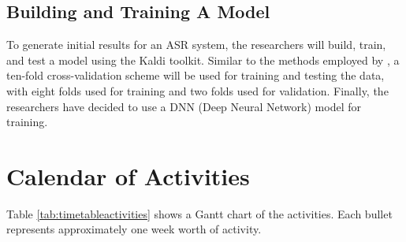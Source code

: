 \subsection{Building and Training A Model}
To generate initial results for an ASR system, the researchers will build, train, and test a model using the Kaldi toolkit. Similar to the methods employed by , a ten-fold cross-validation scheme will be used for training and testing the data, with eight folds used for training and two folds used for validation. Finally, the researchers have decided to use a DNN (Deep Neural Network) model for training.

\section{Calendar of Activities}


Table \ref{tab:timetableactivities} shows a Gantt chart of the activities.  Each bullet represents approximately
one week worth of activity.

%
%
\newcommand{\weekone}{\textbullet}
\newcommand{\weektwo}{\textbullet \textbullet}
\newcommand{\weekthree}{\textbullet \textbullet \textbullet}
\newcommand{\weekfour}{\textbullet \textbullet \textbullet \textbullet}


